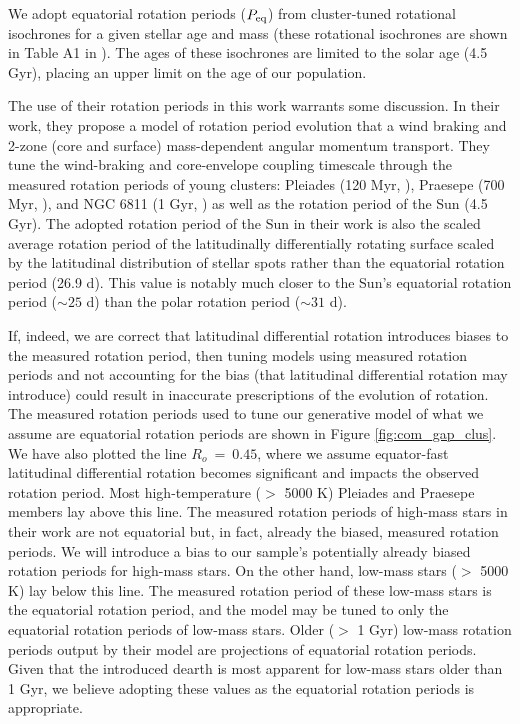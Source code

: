 We adopt equatorial rotation periods ($P_{\rm{eq}}$) from cluster-tuned rotational isochrones for a given stellar age and mass (these rotational isochrones are shown in Table A1 in \citet{spada_competing_2020}).
The ages of these isochrones are limited to the solar age (4.5 Gyr), placing an upper limit on the age of our population.

The use of their rotation periods in this work warrants some discussion.
In their work, they propose a model of rotation period evolution that a wind braking and 2-zone (core and surface) mass-dependent angular momentum transport.
They tune the wind-braking and core-envelope coupling timescale through the measured rotation periods of young clusters: Pleiades (120 Myr, \citep{rebull_rotation_2016}), Praesepe (700 Myr, \citep{douglas_poking_2017, douglas_k2_2019}), and NGC 6811 (1 Gyr, \citep{curtis_temporary_2019}) as well as the rotation period of the Sun (4.5 Gyr).
The adopted rotation period of the Sun in their work is also the scaled average rotation period of the latitudinally differentially rotating surface scaled by the latitudinal distribution of stellar spots rather than the equatorial rotation period (26.9 d).
This value is notably much closer to the Sun's equatorial rotation period ($\sim 25$ d) than the polar rotation period ($\sim 31$ d).

If, indeed, we are correct that latitudinal differential rotation introduces biases to the measured rotation period, then tuning models using measured rotation periods and not accounting for the bias (that latitudinal differential rotation may introduce) could result in inaccurate prescriptions of the evolution of rotation.
The measured rotation periods used to tune our generative model of what we assume are equatorial rotation periods are shown in Figure \ref{fig:com_gap_clus}.
We have also plotted the line $R_o \ = \ 0.45$, where we assume equator-fast latitudinal differential rotation becomes significant and impacts the observed rotation period.
Most high-temperature ($>$ 5000 K) Pleiades and Praesepe members lay above this line.
The measured rotation periods of high-mass stars in their work are not equatorial but, in fact, already the biased, measured rotation periods.
We will introduce a bias to our sample's potentially already biased rotation periods for high-mass stars.
On the other hand, low-mass stars ($>$ 5000 K) lay below this line.
The measured rotation period of these low-mass stars is the equatorial rotation period, and the model may be tuned to only the equatorial rotation periods of low-mass stars.
Older ($>$ 1 Gyr) low-mass rotation periods output by their model are projections of equatorial rotation periods.
Given that the introduced dearth is most apparent for low-mass stars older than 1 Gyr, we believe adopting these values as the equatorial rotation periods is appropriate.

